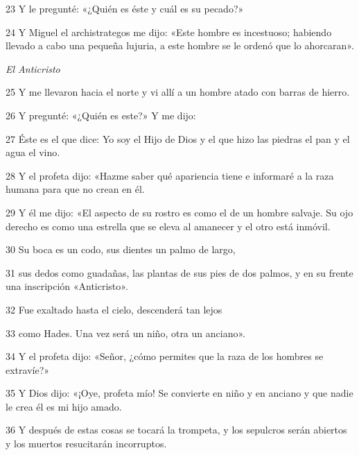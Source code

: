 \par 23 Y le pregunté: «¿Quién es éste y cuál es su pecado?»

\par 24 Y Miguel el archistrategos me dijo: «Este hombre es incestuoso; habiendo llevado a cabo una pequeña lujuria, a este hombre se le ordenó que lo ahorcaran».

\par \textit{El Anticristo}

\par 25 Y me llevaron hacia el norte y vi allí a un hombre atado con barras de hierro.

\par 26 Y pregunté: «¿Quién es este?» Y me dijo: 

\par 27 Éste es el que dice: Yo soy el Hijo de Dios y el que hizo las piedras el pan y el agua el vino.

\par 28 Y el profeta dijo: «Hazme saber qué apariencia tiene e informaré a la raza humana para que no crean en él.

\par 29 Y él me dijo: «El aspecto de su rostro es como el de un hombre salvaje. Su ojo derecho es como una estrella que se eleva al amanecer y el otro está inmóvil.

\par 30 Su boca es un codo, sus dientes un palmo de largo,

\par 31 sus dedos como guadañas, las plantas de sus pies de dos palmos, y en su frente una inscripción «Anticristo».

\par 32 Fue exaltado hasta el cielo, descenderá tan lejos

\par 33 como Hades. Una vez será un niño, otra un anciano». 

\par 34 Y el profeta dijo: «Señor, ¿cómo permites que la raza de los hombres se extravíe?»

\par 35 Y Dios dijo: «¡Oye, profeta mío! Se convierte en niño y en anciano y que nadie le crea él es mi hijo amado.

\par 36 Y después de estas cosas se tocará la trompeta, y los sepulcros serán abiertos y los muertos resucitarán incorruptos.

